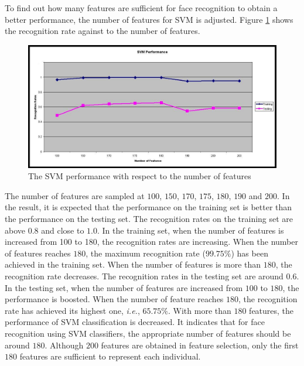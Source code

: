 To find out how many features are sufficient for face recognition to obtain a better performance, the number of features for SVM is adjusted. \mbox{Figure} \ref{fig:SVMvsNoFeatures} shows the recognition rate against to the number of features.
\begin{figure}[t]
 \begin{center}
  \includegraphics[width=\columnwidth]{ch5/figures/SVMPerformance.jpg}
 \caption{The SVM performance with respect to the number of features}
  \label{fig:SVMvsNoFeatures}
 \end{center}
\end{figure} 
The number of features are sampled at $100$, $150$, $170$, $175$, $180$, $190$ and $200$. In the result, it is expected that the performance on the training set is better than the performance on the testing set. The recognition rates on the training set are above $0.8$ and close to $1.0$. In the training set, when the number of features is increased from 100 to 180, the recognition rates are increasing. When the number of features reaches $180$, the maximum recognition rate ($99.75\%$) has been achieved in the training set. When the number of features is more than $180$, the recognition rate decreases. The recognition rates in the testing set are around $0.6$. In the testing set, when the number of features are increased from $100$ to $180$, the performance is boosted. When the number of feature reaches $180$, the recognition rate has achieved its highest one, \textit{i.e.}, $65.75\%$. With more than $180$ features, the performance of SVM classification is decreased. It indicates that for face recognition using SVM classifiers, the appropriate number of features should be around $180$. Although $200$ features are obtained in feature selection, only the first $180$ features are sufficient to represent each individual. 

